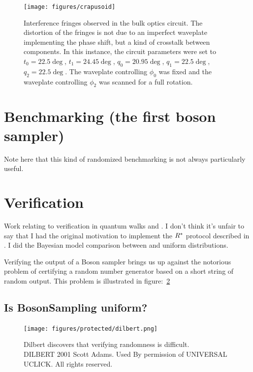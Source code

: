 \begin{figure}
  \centering
  \texttt{[image: figures/crapusoid]}
  \caption[Interference fringes distorted by crosstalk between components]
  {Interference fringes observed in the bulk optics circuit. The distortion of
  the fringes is not due to an imperfect waveplate implementing the phase shift,
  but a kind of crosstalk between components. In this instance, the circuit
  parameters were set to \(t_{0}=22.5\deg\), \(t_{1}=24.45\deg\),
  \(q_{0}=20.95\deg\), \(q_{1}=22.5\deg\), \(q_{2}=22.5\deg\). The waveplate
  controlling \(\phi_{0}\) was fixed and the waveplate controlling \(\phi_{2}\)
  was scanned for a full rotation.}
  \label{fig:crapusoid}
\end{figure}

\section{Benchmarking (the first boson sampler)}
\label{sec:Benchmarking}
Note here that this kind of randomized benchmarking is not always particularly
useful.

\section{Verification}
\label{sec:Verification}
Work relating to verification in quantum walks and \bosonsampling{}. I don't
think it's unfair to say that I had the original motivation to implement the
\(R^{*}\) protocol described in \cite{notuniform}. I did the Bayesian model
comparison between \bosonsampling{} and uniform distributions.

Verifying the output of a Boson sampler brings us up against the notorious
problem of certifying a random number generator based on a short string of
random output. This problem is illustrated in figure:~\ref{fig:dilbert}

\subsection{Is BosonSampling uniform?}
\label{sec:RStar}
\begin{figure}
  \centering
  \texttt{[image: figures/protected/dilbert.png]}
  \caption[Dilbert discovers that verifying randomness is difficult.]
  {Dilbert discovers that verifying randomness is difficult.\\DILBERT
  \textcopyright{} 2001 Scott Adams. Used By permission of UNIVERSAL UCLICK. All
  rights reserved.}
  \label{fig:dilbert}
\end{figure}

